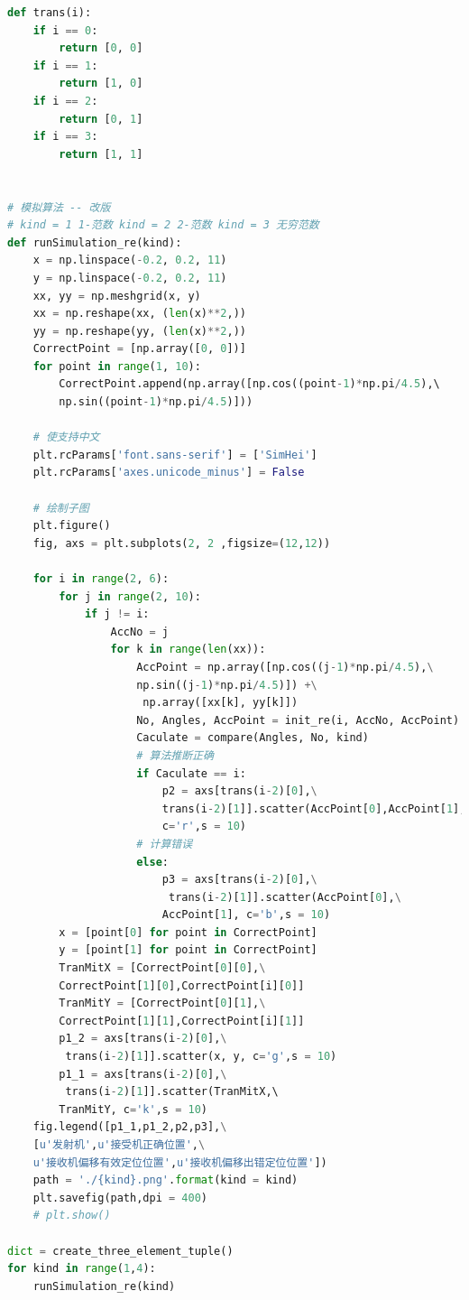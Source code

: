 \documentclass{my_paper}
\begin{document}
\begin{lstlisting}[language=Python]
def trans(i):
    if i == 0:
        return [0, 0]
    if i == 1:
        return [1, 0]
    if i == 2:
        return [0, 1]
    if i == 3:
        return [1, 1]


# 模拟算法 -- 改版
# kind = 1 1-范数 kind = 2 2-范数 kind = 3 无穷范数
def runSimulation_re(kind):
    x = np.linspace(-0.2, 0.2, 11)
    y = np.linspace(-0.2, 0.2, 11)
    xx, yy = np.meshgrid(x, y)
    xx = np.reshape(xx, (len(x)**2,))
    yy = np.reshape(yy, (len(x)**2,))
    CorrectPoint = [np.array([0, 0])]
    for point in range(1, 10):
        CorrectPoint.append(np.array([np.cos((point-1)*np.pi/4.5),\ 
        np.sin((point-1)*np.pi/4.5)]))

    # 使支持中文
    plt.rcParams['font.sans-serif'] = ['SimHei']
    plt.rcParams['axes.unicode_minus'] = False
    
    # 绘制子图
    plt.figure()
    fig, axs = plt.subplots(2, 2 ,figsize=(12,12))
    
    for i in range(2, 6):
        for j in range(2, 10):
            if j != i:
                AccNo = j
                for k in range(len(xx)):
                    AccPoint = np.array([np.cos((j-1)*np.pi/4.5),\
                    np.sin((j-1)*np.pi/4.5)]) +\
                     np.array([xx[k], yy[k]])
                    No, Angles, AccPoint = init_re(i, AccNo, AccPoint)
                    Caculate = compare(Angles, No, kind)
                    # 算法推断正确
                    if Caculate == i:
                        p2 = axs[trans(i-2)[0],\
                        trans(i-2)[1]].scatter(AccPoint[0],AccPoint[1],\
                        c='r',s = 10)
                    # 计算错误
                    else:                        
                        p3 = axs[trans(i-2)[0],\
                         trans(i-2)[1]].scatter(AccPoint[0],\
                        AccPoint[1], c='b',s = 10)
        x = [point[0] for point in CorrectPoint]
        y = [point[1] for point in CorrectPoint]
        TranMitX = [CorrectPoint[0][0],\
        CorrectPoint[1][0],CorrectPoint[i][0]]
        TranMitY = [CorrectPoint[0][1],\
        CorrectPoint[1][1],CorrectPoint[i][1]]
        p1_2 = axs[trans(i-2)[0],\
         trans(i-2)[1]].scatter(x, y, c='g',s = 10)
        p1_1 = axs[trans(i-2)[0],\
         trans(i-2)[1]].scatter(TranMitX,\ 
        TranMitY, c='k',s = 10)
    fig.legend([p1_1,p1_2,p2,p3],\
    [u'发射机',u'接受机正确位置',\
    u'接收机偏移有效定位位置',u'接收机偏移出错定位位置'])
    path = './{kind}.png'.format(kind = kind)
    plt.savefig(path,dpi = 400)
    # plt.show()

dict = create_three_element_tuple()
for kind in range(1,4):
    runSimulation_re(kind)

\end{lstlisting}
\end{document}
